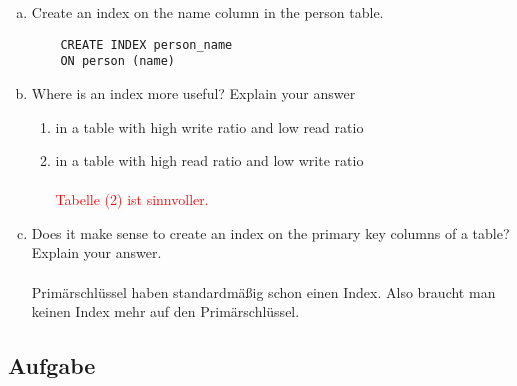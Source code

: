 \documentclass[11pt,a4paper,DIV=9]{scrartcl}
\newcounter{temp}
\newcommand{\aufgabe}[1]{
  \setcounter{temp}{\value{subsection}}
  \setcounter{subsection}{#1}
  \addtocounter{subsection}{-1}
  \subsection{Aufgabe}
  \setcounter{subsection}{\value{temp}}
}
\begin{document}
    \begin{enumerate}[a.]
    \item Create an index on the name column in the person table.
    \begin{lstlisting}
    CREATE INDEX person_name
    ON person (name)
    \end{lstlisting}
    \item Where is an index more useful? Explain your answer
    \begin{enumerate}[1.]
    \item in a table with high write ratio and low read ratio
    \item in a table with high read ratio and low write ratio
    \\\\\textcolor{red}{Tabelle (2) ist sinnvoller.}
    \end{enumerate}
    \item Does it make sense to create an index on the primary key columns of a table? Explain your answer. \\\\
    Prim\"arschl\"ussel haben standardm\"a{\ss}ig schon einen Index. Also braucht man keinen Index mehr auf den Prim\"arschl\"ussel.
    \end{enumerate}
    \aufgabe{4}
\end{document}
